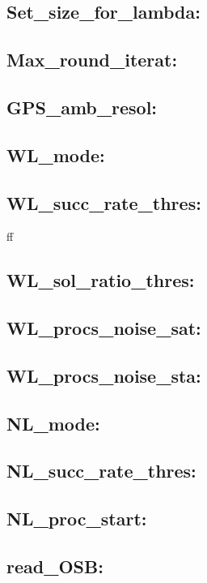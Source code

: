 \subsection{Set\_size\_for\_lambda:}

\subsection{Max\_round\_iterat:}

\subsection{GPS\_amb\_resol:}

\subsection{WL\_mode:}

\subsection{WL\_succ\_rate\_thres:}

ff
\subsection{WL\_sol\_ratio\_thres:}

\subsection{WL\_procs\_noise\_sat:}

\subsection{WL\_procs\_noise\_sta:}

\subsection{NL\_mode:}

\subsection{NL\_succ\_rate\_thres:}

\subsection{NL\_proc\_start:}

\subsection{read\_OSB:}

